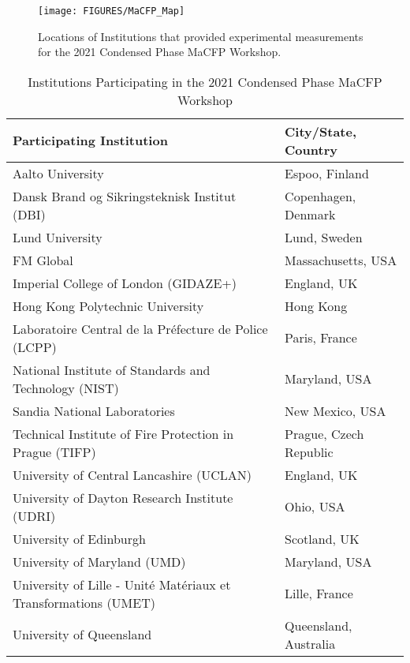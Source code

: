 \documentclass{book}
\begin{document}
\begin{figure}
  \centering
  \texttt{[image: FIGURES/MaCFP\_Map]}
  \caption{Locations of Institutions that provided experimental measurements for the 2021 Condensed Phase MaCFP Workshop.}
  \label{Fig:MaCFP_Map_20200831}
\end{figure}

\begin{table}
\caption{Institutions Participating in the 2021 Condensed Phase MaCFP Workshop}
\label{Table_1}
\begin{center}
\begin{tabular}{|ll|}
\hline
 \textbf{Participating Institution}                                 &  \textbf{City/State, Country} \\ \hline \hline
Aalto University                                                    & Espoo, Finland \\ \hline
Dansk Brand og Sikringsteknisk Institut (DBI)                       & Copenhagen, Denmark \\ \hline
Lund University                                                     & Lund, Sweden \\ \hline
FM Global                                                           & Massachusetts, USA \\ \hline
Imperial College of London (GIDAZE+)                                & England, UK \\ \hline
Hong Kong Polytechnic University                                    & Hong Kong \\ \hline
Laboratoire Central de la Préfecture de Police (LCPP)               & Paris, France \\ \hline
National Institute of Standards and Technology (NIST)               & Maryland, USA \\ \hline
Sandia National Laboratories                                        & New Mexico, USA \\ \hline
Technical Institute of Fire Protection in Prague (TIFP)             & Prague, Czech Republic \\ \hline
University of Central Lancashire (UCLAN)                            & England, UK \\ \hline
University of Dayton Research Institute (UDRI)                      & Ohio, USA \\ \hline
University of Edinburgh                                             & Scotland, UK \\ \hline
University of Maryland (UMD)                                        & Maryland, USA \\ \hline
University of Lille - Unité Matériaux et Transformations (UMET)     & Lille, France \\ \hline
University of Queensland                                            & Queensland, Australia \\ \hline
\end{tabular}
\end{center}
\end{table}
\end{document}
